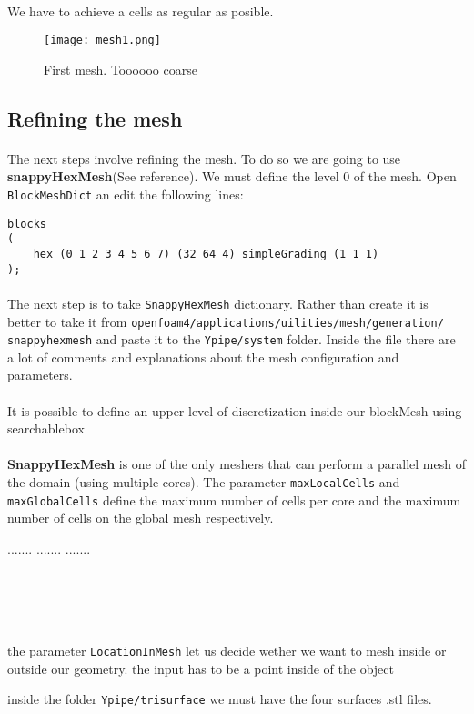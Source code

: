 \paragraph{}We have to achieve a cells as regular as posible.
\begin{figure}[h!]
\centering
\texttt{[image: mesh1.png]}
\caption{First mesh. Toooooo coarse}
\end{figure}

\subsection{Refining the mesh}
\paragraph{}The next steps involve refining the mesh. To do so we are going to use \textbf{snappyHexMesh}(See reference). We must define the level 0 of the mesh. Open \texttt{BlockMeshDict} an edit the following lines:
\begin{center}
\begin{lstlisting}
blocks
(
    hex (0 1 2 3 4 5 6 7) (32 64 4) simpleGrading (1 1 1)
);
\end{lstlisting}
\end{center}

\paragraph{}The next step is to take \texttt{SnappyHexMesh} dictionary. Rather than create it is better to take it from \texttt{openfoam4/applications/uilities/mesh/generation/\\snappyhexmesh} and paste it to the \texttt{Ypipe/system} folder. Inside the file there are a lot of comments and explanations about the mesh configuration and parameters.

\paragraph{}It is possible to define an upper level of discretization inside our blockMesh using searchablebox

\paragraph{}\textbf{SnappyHexMesh} is one of the only meshers that can perform a parallel mesh of the domain (using multiple cores). The parameter \texttt{maxLocalCells} and \texttt{maxGlobalCells} define the maximum number of cells per core and the maximum number of cells on the global mesh respectively.



.......
.......
.......\\\\\\\\\


the parameter \texttt{LocationInMesh} let us decide wether we want to mesh inside or outside our geometry. the input has to be a point inside of the object

inside the folder \texttt{Ypipe/trisurface} we must have the four surfaces .stl files.